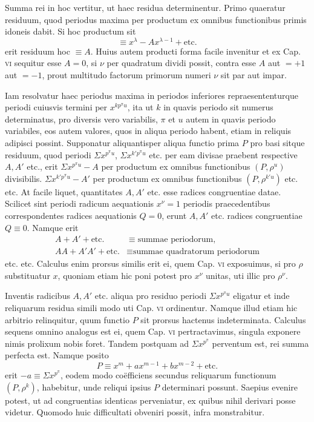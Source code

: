 Summa rei in hoc vertitur, ut haec residua determinentur. Primo quaeratur residuum, quod periodus maxima per productum ex omnibus functionibus primis idoneis dabit. Si hoc productum sit
\[
\equiv x^\lambda-Ax^{\lambda-1}+\text{etc.}
\]
erit residuum hoc $\equiv A$. Huius autem producti forma facile invenitur et ex Cap. \textsc{vi} sequitur esse $A=0$, si $\nu$ per quadratum dividi possit, contra esse $A$ aut $=+1$ aut $=-1$, prout multitudo factorum primorum numeri $\nu$ sit par aut impar.

Iam resolvatur haec periodus maxima in periodos inferiores repraesententurque periodi cuiusvis termini per $x^{kp^\pi u}$, ita ut $k$ in quavis periodo sit numerus
determinatus, pro diversis vero variabilis, $\pi$ et $u$ autem in quavis periodo variabiles, eos autem valores, quos in aliqua periodo habent, etiam in reliquis adipisci possint. Supponatur aliquantisper aliqua functio prima $P$ pro basi sitque residuum, quod periodi $\Sigma x^{p^\pi u}$, $\Sigma x^{k'p^\pi u}$ etc. per eam divisae praebent respective $A,A'$ etc., erit $\Sigma x^{p^\pi u}-A$ per productum ex omnibus functionibus $(P,\rho^u)$ divisibilis. $\Sigma x^{k'p^\pi u}-A'$ per productum ex omnibus functionibus $(P,\rho^{k'u})$ etc. etc. At facile liquet, quantitates $A,A'$ etc. esse radices congruentiae datae. Scilicet sint periodi radicum aequationis $x^\nu=1$ periodis praecedentibus correspondentes radices aequationis $Q=0$, erunt $A,A'$ etc. radices congruentiae $Q\equiv0$. Namque erit
\[
\begin{aligned}
A+A'+\text{etc.}&\equiv\text{summae periodorum},\\
AA+A'A'+\text{etc.}&\equiv\text{summae quadratorum periodorum}
\end{aligned}
\]
etc. etc. Calculus enim prorsus similis erit ei, quem Cap. \textsc{vi} exposuimus, si pro $\rho$ substituatur $x$, quoniam etiam hic poni potest pro $x^\nu$ unitas, uti illic pro $\rho^\nu$.

Inventis radicibus $A,A'$ etc. aliqua pro residuo periodi $\Sigma x^{p^\pi u}$ eligatur et inde reliquarum residua simili modo uti Cap. \textsc{vi} ordinentur. Namque illud etiam hic arbitrio relinquitur, quum functio $P$ sit prorsus hactenus indeterminata. Calculus sequens omnino analogus est ei, quem Cap. \textsc{vi} pertractavimus, singula exponere nimis prolixum nobis foret. Tandem postquam ad $\Sigma x^{p^\pi}$ perventum est, rei summa perfecta est. Namque posito
\[
P\equiv x^m+ax^{m-1}+bx^{m-2}+\text{etc.}
\]
erit $-a\equiv\Sigma x^{p^\pi}$, eodem modo coëfficiens secundus reliquarum functionum $(P,\rho^k)$, habebitur, unde reliqui ipsius $P$ determinari possunt. Saepius evenire potest, ut ad congruentias identicas perveniatur, ex quibus nihil derivari posse videtur. Quomodo huic difficultati obveniri possit, infra monstrabitur.

